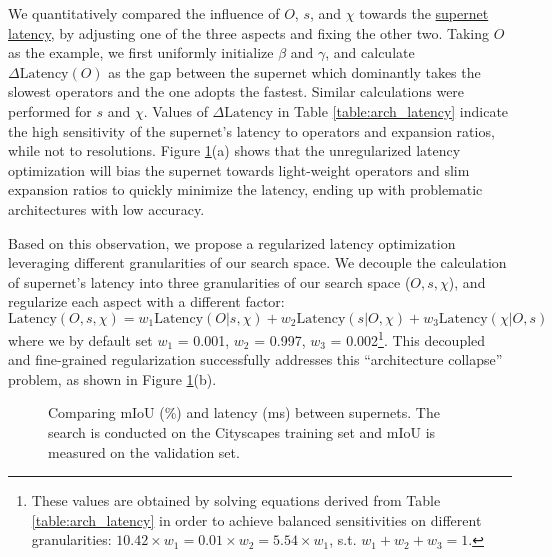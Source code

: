 \documentclass{article} \usepackage{iclr2020_conference,times}
\begin{document}
We quantitatively compared the influence of $O$, $s$, and $\chi$ towards the \underline{supernet latency}, by adjusting one of the three aspects and fixing the other two. Taking $O$ as the example, we first uniformly initialize $\beta$ and $\gamma$, and calculate $\Delta \mathrm{Latency}(O)$ as the gap between the supernet which dominantly takes the slowest operators and the one adopts the fastest.
Similar calculations were performed for $s$ and $\chi$. Values of $\Delta \mathrm{Latency}$ in Table \ref{table:arch_latency} indicate the high sensitivity of the supernet's latency to operators and expansion ratios, while not to resolutions. Figure \ref{fig:search_curve}(a) shows that the unregularized latency optimization will bias the supernet towards light-weight operators and slim expansion ratios to quickly minimize the latency, ending up with problematic architectures with low accuracy.

Based on this observation, we propose a regularized latency optimization leveraging different granularities of our search space. We decouple the calculation of supernet's latency into three granularities of our search space ($O, s, \chi$), and regularize each aspect with a different factor:
\begin{equation}
    \mathrm{Latency}(O,s,\chi) = w_1 \mathrm{Latency}(O|s,\chi) + w_2 \mathrm{Latency}(s|O,\chi) + w_3 \mathrm{Latency}(\chi|O,s)
\end{equation}
where we by default set $w_1$ = 0.001, $w_2$ = 0.997, $w_3$ = 0.002\footnote{These values are obtained by solving equations derived from Table \ref{table:arch_latency} in order to achieve balanced sensitivities on different granularities: $10.42 \times w_1 = 0.01 \times w_2 = 5.54 \times w_1$, s.t. $w_1 + w_2 + w_3 = 1$.}. This decoupled and fine-grained regularization successfully addresses this ``architecture collapse'' problem, as shown in Figure \ref{fig:search_curve}(b).


\begin{figure}[ht]
\vspace{-1em}
\begin{center}
\hfill
{} 
\vspace{-0.5em}
\caption{Comparing mIoU (\%) and latency (ms)  between supernets. The search is conducted on the Cityscapes training set and mIoU is measured on the validation set.}
\vspace{-1em}
\label{fig:search_curve}
\end{center}
\end{figure}
\end{document}
